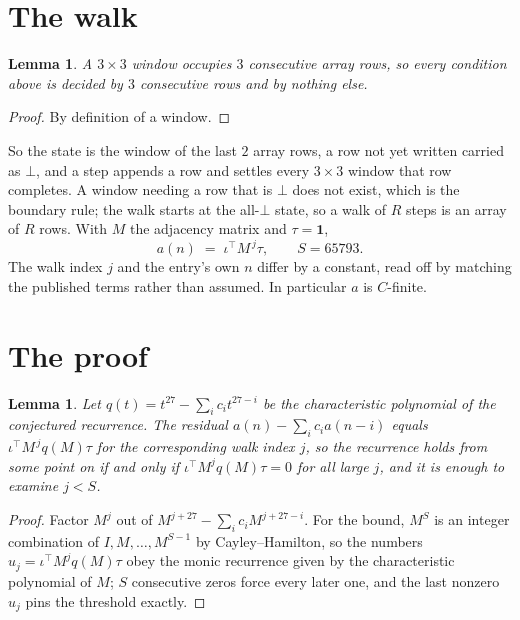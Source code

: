 \documentclass[11pt,a4paper]{article}
\theoremstyle{plain}
\newtheorem{lemma}[theorem]{Lemma}
\theoremstyle{definition}
\begin{document}
\section{The walk}

\begin{lemma}\label{lem:win}
A $3\times3$ window occupies $3$ consecutive array rows, so every condition above is
decided by $3$ consecutive rows and by nothing else.
\end{lemma}

\begin{proof}
By definition of a window.
\end{proof}

So the state is the window of the last $2$ array rows, a row not yet written carried as
$\bot$, and a step appends a row and settles every $3\times3$ window that row completes. A
window needing a row that is $\bot$ does not exist, which is the boundary rule; the walk starts
at the all-$\bot$ state, so a walk of $R$ steps is an array of $R$ rows. With $M$ the adjacency
matrix and $\tau=\mathbf{1}$,
\[
a(n)\;=\;\iota^{\!\top}M^{\,j}\tau ,\qquad S=65793.
\]
The walk index $j$ and the entry's own $n$ differ by a constant, read off by matching the
published terms rather than assumed. In particular $a$ is $C$-finite.

\section{The proof}

\begin{lemma}\label{lem:crit}
Let $q(t)=t^{27}-\sum_i c_it^{27-i}$ be the characteristic polynomial of the
conjectured recurrence. The residual $a(n)-\sum_ic_ia(n-i)$ equals
$\iota^{\!\top}M^{\,j}q(M)\tau$ for the corresponding walk index $j$, so the recurrence
holds from some point on if and only if $\iota^{\!\top}M^{j}q(M)\tau=0$ for all large $j$,
and it is enough to examine $j<S$.
\end{lemma}

\begin{proof}
Factor $M^{j}$ out of $M^{j+27}-\sum_ic_iM^{j+27-i}$. For the bound, $M^{S}$
is an integer combination of $I,M,\dots,M^{S-1}$ by Cayley--Hamilton, so the numbers
$u_j=\iota^{\!\top}M^{j}q(M)\tau$ obey the monic recurrence given by the characteristic
polynomial of $M$; $S$ consecutive zeros force every later one, and the last nonzero $u_j$
pins the threshold exactly.
\end{proof}
\end{document}
